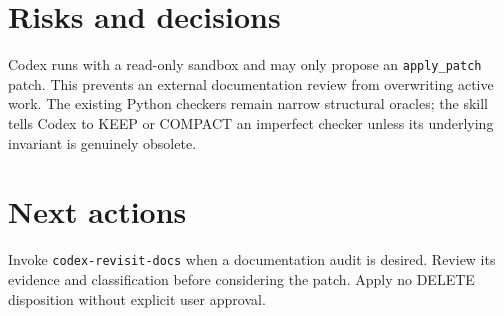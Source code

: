 \documentclass[11pt]{article}
\begin{document}
\section{Risks and decisions}
Codex runs with a read-only sandbox and may only propose an
\texttt{apply\_patch} patch. This prevents an external documentation review from
overwriting active work. The existing Python checkers remain narrow structural
oracles; the skill tells Codex to KEEP or COMPACT an imperfect checker unless
its underlying invariant is genuinely obsolete.

\section{Next actions}
Invoke \texttt{codex-revisit-docs} when a documentation audit is desired.
Review its evidence and classification before considering the patch. Apply no
DELETE disposition without explicit user approval.
\end{document}
